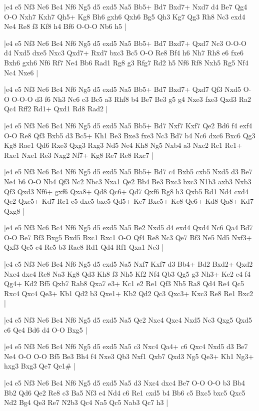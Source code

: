 \whitename{}
\blackname{}
\makegametitle
|e4 e5 Nf3 Nc6 Bc4 Nf6 Ng5 d5 exd5 Na5 Bb5+ Bd7 Bxd7+ Nxd7 d4 Be7 Qg4 O-O Nxh7 Kxh7 Qh5+ Kg8 Bh6 gxh6 Qxh6 Bg5 Qh3 Kg7 Qg3 Rh8 Nc3 exd4 Ne4 Re8 f3 Kf8 h4 Bf6 O-O-O Nb6 h5  |

\whitename{}
\blackname{}
\makegametitle
|e4 e5 Nf3 Nc6 Bc4 Nf6 Ng5 d5 exd5 Na5 Bb5+ Bd7 Bxd7+ Qxd7 Nc3 O-O-O d4 Nxd5 dxe5 Nxc3 Qxd7+ Rxd7 bxc3 Bc5 O-O Re8 Bf4 h6 Nh7 Rh8 e6 fxe6 Bxh6 gxh6 Nf6 Rf7 Ne4 Bb6 Rad1 Rg8 g3 Rfg7 Rd2 h5 Nf6 Rf8 Nxh5 Rg5 Nf4 Nc4 Nxe6  |

\whitename{}
\blackname{}
\makegametitle
|e4 e5 Nf3 Nc6 Bc4 Nf6 Ng5 d5 exd5 Na5 Bb5+ Bd7 Bxd7+ Qxd7 Qf3 Nxd5 O-O O-O-O d3 f6 Nh3 Nc6 c3 Bc5 a3 Rhf8 b4 Be7 Be3 g5 g4 Nxe3 fxe3 Qxd3 Ra2 Qc4 Rff2 Rd1+ Qxd1 Rd8 Rad2  |

\whitename{}
\blackname{}
\makegametitle
|e4 e5 Nf3 Nc6 Bc4 Nf6 Ng5 d5 exd5 Na5 Bb5+ Bd7 Nxf7 Kxf7 Qe2 Bd6 f4 exf4 O-O Re8 Qf3 Bxb5 d3 Bc5+ Kh1 Be3 Bxe3 fxe3 Nc3 Bd7 b4 Nc6 dxc6 Bxc6 Qg3 Kg8 Rae1 Qd6 Rxe3 Qxg3 Rxg3 Nd5 Ne4 Kh8 Ng5 Nxb4 a3 Nxc2 Rc1 Re1+ Rxe1 Nxe1 Re3 Nxg2 Nf7+ Kg8 Re7 Re8 Rxc7  |

\whitename{}
\blackname{}
\makegametitle
|e4 e5 Nf3 Nc6 Bc4 Nf6 Ng5 d5 exd5 Na5 Bb5+ Bd7 c4 Bxb5 cxb5 Nxd5 d3 Be7 Ne4 b6 O-O Nb4 Qf3 Nc2 Nbc3 Nxa1 Qe2 Bb4 Be3 Bxc3 bxc3 N1b3 axb3 Nxb3 Qf3 Qxd3 Nf6+ gxf6 Qxa8+ Qd8 Qc6+ Qd7 Qxf6 Rg8 h3 Qxb5 Rd1 Nd4 cxd4 Qe2 Qxe5+ Kd7 Rc1 c5 dxc5 bxc5 Qd5+ Ke7 Bxc5+ Ke8 Qc6+ Kd8 Qa8+ Kd7 Qxg8  |

\whitename{}
\blackname{}
\makegametitle
|e4 e5 Nf3 Nc6 Bc4 Nf6 Ng5 d5 exd5 Na5 Be2 Nxd5 d4 exd4 Qxd4 Nc6 Qa4 Bd7 O-O Be7 Bf3 Bxg5 Bxd5 Bxc1 Rxc1 O-O Qf4 Re8 Nc3 Qe7 Bf3 Ne5 Nd5 Nxf3+ Qxf3 Qc5 c4 Re5 b3 Rae8 Rd1 Qd4 Rf1 Qxa1 Ne3  |

\whitename{}
\blackname{}
\makegametitle
|e4 e5 Nf3 Nc6 Bc4 Nf6 Ng5 d5 exd5 Na5 Nxf7 Kxf7 d3 Bb4+ Bd2 Bxd2+ Qxd2 Nxc4 dxc4 Re8 Na3 Kg8 Qd3 Kh8 f3 Nh5 Kf2 Nf4 Qb3 Qg5 g3 Nh3+ Ke2 e4 f4 Qg4+ Kd2 Bf5 Qxb7 Rab8 Qxa7 e3+ Kc1 e2 Re1 Qf3 Nb5 Ra8 Qd4 Re4 Qc5 Rxc4 Qxc4 Qe3+ Kb1 Qd2 b3 Qxe1+ Kb2 Qd2 Qc3 Qxc3+ Kxc3 Re8 Re1 Bxc2  |

\whitename{}
\blackname{}
\makegametitle
|e4 e5 Nf3 Nc6 Bc4 Nf6 Ng5 d5 exd5 Na5 Qe2 Nxc4 Qxc4 Nxd5 Nc3 Qxg5 Qxd5 c6 Qe4 Bd6 d4 O-O Bxg5  |

\whitename{}
\blackname{}
\makegametitle
|e4 e5 Nf3 Nc6 Bc4 Nf6 Ng5 d5 exd5 Na5 c3 Nxc4 Qa4+ c6 Qxc4 Nxd5 d3 Be7 Ne4 O-O O-O Bf5 Be3 Bh4 f4 Nxe3 Qb3 Nxf1 Qxb7 Qxd3 Ng5 Qe3+ Kh1 Ng3+ hxg3 Bxg3 Qe7 Qe1\#  |

\whitename{}
\blackname{}
\makegametitle
|e4 e5 Nf3 Nc6 Bc4 Nf6 Ng5 d5 exd5 Na5 d3 Nxc4 dxc4 Be7 O-O O-O b3 Bb4 Bb2 Qd6 Qe2 Re8 c3 Ba5 Nf3 e4 Nd4 c6 Re1 cxd5 b4 Bb6 c5 Bxc5 bxc5 Qxc5 Nd2 Bg4 Qe3 Re7 N2b3 Qc4 Na5 Qc5 Nab3 Qc7 h3  |

